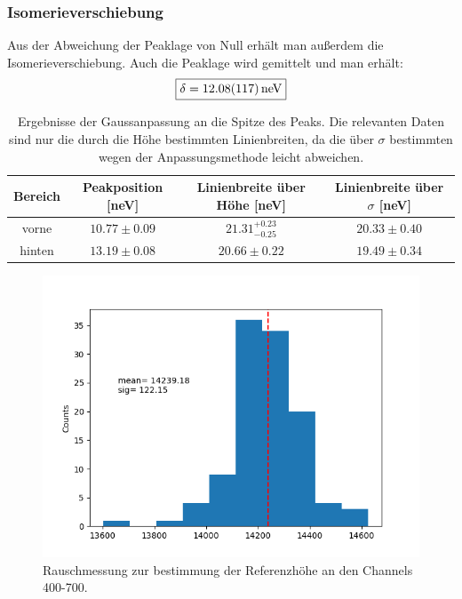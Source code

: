 \documentclass[12pt,a4paper]{article}
\begin{document}
\subsubsection{Isomerieverschiebung}
Aus der Abweichung der Peaklage von Null erhält man außerdem die Isomerieverschiebung. Auch die Peaklage wird gemittelt und man erhält:
\begin{equation*}
\boxed{\delta = \SI{12.08\pm 1.17}{neV}}
\end{equation*}

\begin{table}
\centering
\begin{tabular}{|c|c|c|c|}
\hline 
Bereich & Peakposition [neV] & Linienbreite über Höhe [neV] & Linienbreite über $\sigma$ [neV]\\ 
\hline 
vorne & $10.77\pm 0.09$ & $21.31^{+0.23}_{-0.25}$ & $20.33\pm 0.40$ \\ 
\hline 
hinten & $13.19\pm 0.08$ & $20.66 \pm 0.22$ & $19.49\pm 0.34$ \\ 
\hline 
\end{tabular}
\caption{Ergebnisse der Gaussanpassung an die Spitze des Peaks. Die relevanten Daten sind nur die durch die Höhe bestimmten Linienbreiten, da die über $\sigma$ bestimmten wegen der Anpassungsmethode leicht abweichen.}
\label{tab:Ein_halbgauss}
\end{table}

\begin{figure}
\centering
\includegraphics[scale=0.8]{Bilder/Einlinien/Ein_Rausch.png}
\caption{Rauschmessung zur bestimmung der Referenzhöhe an den Channels 400-700.}
\label{fig:Ein_Rausch}
\end{figure}
\end{document}
